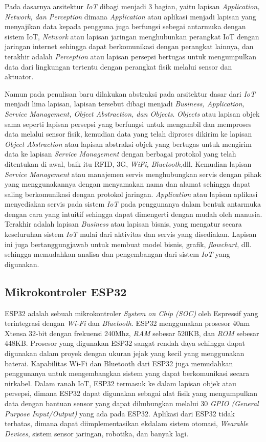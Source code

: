 Pada dasarnya arsitektur \textit{IoT} dibagi menjadi 3 bagian, yaitu lapisan \textit{Application, Network, dan Perception} dimana \textit{Application} atau aplikasi menjadi lapisan yang menyajikan data kepada pengguna juga berfungsi sebegai antarmuka dengan sistem IoT, \textit{Network} atau lapisan jaringan menghubunkan perangkat IoT dengan jaringan internet sehingga dapat berkomunikasi dengan perangkat lainnya, dan terakhir adalah \textit{Perception} atau lapisan persepsi bertugas untuk mengumpulkan data dari lingkungan tertentu dengan perangkat fisik melalui sensor dan aktuator.

Namun pada penulisan baru dilakukan abstraksi pada arsitektur dasar dari \textit{IoT} menjadi lima lapisan, lapisan tersebut dibagi menjadi \textit{Business, Application, Service Management, Object Abstraction, dan Objects}. \textit{Objects} atau lapisan objek sama seperti lapisan persepsi yang berfungsi untuk mengambil dan memproses data melalui sensor fisik, kemudian data yang telah diproses dikirim ke lapisan \textit{Object Abstraction} atau lapisan abstraksi objek yang bertugas untuk mengirim data ke lapisan \textit{Service Management} dengan berbagai protokol yang telah ditentukan di awal, baik itu RFID, 3G, \textit{WiFi, Bluetooth},dll. Kemudian lapisan \textit{Service Management} atau manajemen servis menghubungkan servis dengan pihak yang menggunakannya dengan menyamakan nama dan alamat sehingga dapat saling berkomunikasi dengan protokol jaringan. \textit{Application} atau lapisan aplikasi menyediakan servis pada sistem \textit{IoT} pada penggunanya dalam bentuk antarmuka dengan cara yang intuitif sehingga dapat dimengerti dengan mudah oleh manusia. Terakhir adalah lapisan \textit{Business} atau lapisan bisnis, yang mengatur secara keseluruhan sistem \textit{IoT} mulai dari aktivitas dan servis yang disediakan. Lapisan ini juga bertanggungjawab untuk membuat model bisnis, grafik, \textit{flowchart}, dll. sehingga memudahkan analisa dan pengembangan dari sistem \textit{IoT} yang digunakan. \parencite{iot-arab}

\subsection{Mikrokontroler ESP32}
ESP32 adalah sebuah mikrokontroler \textit{System on Chip (SOC)} oleh Espressif yang terintegrasi dengan \textit{Wi-Fi} dan \textit{Bluetooth}. ESP32 menggunakan prosesor 40nm Xtensa 32-bit dengan frekuensi 240Mhz, \textit{RAM} sebesar 520KB, dan \textit{ROM} sebesar 448KB. Prosesor yang digunakan ESP32 sangat rendah daya sehingga dapat digunakan dalam proyek dengan ukuran jejak yang kecil yang menggunakan baterai. Kapabilitas Wi-Fi dan Bluetooth dari ESP32 juga memudahkan penggunanya untuk  mengembangkan sistem yang dapat berkomunikasi secara nirkabel. Dalam ranah IoT, ESP32 termasuk ke dalam lapisan objek atau persepsi, dimana ESP32 dapat digunakan sebagai alat fisik yang mengumpulkan data dengan bantuan sensor yang dapat dihubungkan melalui 30 \textit{GPIO (General Purpose Input/Output)} yang ada pada ESP32. Aplikasi dari ESP32 tidak terbatas, dimana dapat diimplementasikan ekdalam sistem otomasi, \textit{Wearable Devices}, sistem sensor jaringan, robotika, dan banyak lagi. \parencite{esp32}


